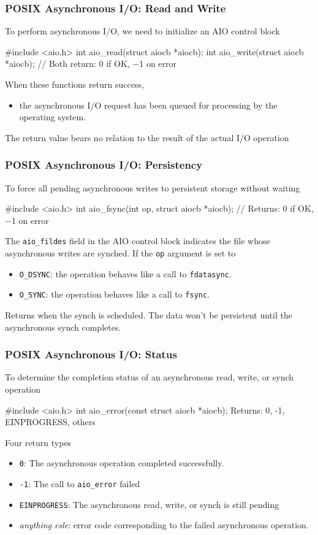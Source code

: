 \documentclass[newPxFont,sthlmFooter,nooffset]{beamer}
\begin{document}
\begin{frame}[t, fragile]
  \frametitle{POSIX Asynchronous I/O: Read and Write}
To perform asynchronous I/O, we need to initialize an AIO control block
\begin{codedef}
#include <aio.h>
int aio_read(struct aiocb *aiocb); int aio_write(struct aiocb *aiocb);
// Both return: 0 if OK, −1 on error
\end{codedef}
\bigskip
When these functions return success, 
\begin{itemize}
\item the asynchronous I/O request has been queued for processing by
  the operating system.
\end{itemize}
\bigskip

The return value bears no relation to the result of the actual I/O operation
\end{frame}


\begin{frame}[t, fragile]
  \frametitle{POSIX Asynchronous I/O: Persistency}
To force all pending asynchronous writes to persistent storage without waiting
\begin{codedef}
#include <aio.h>
int aio_fsync(int op, struct aiocb *aiocb);
// Returns: 0 if OK, −1 on error
\end{codedef}
The \texttt{aio\_fildes} field in the AIO control block indicates the file whose asynchronous writes are synched. 
\bigskip
If the \texttt{op} argument is set to
\begin{itemize}
\item \texttt{O\_DSYNC}: the operation behaves like a call to
  \texttt{fdatasync}.
\item \texttt{O\_SYNC}: the operation behaves like a call to \texttt{fsync}.
\end{itemize}

Returns when the synch is scheduled. The data won’t be persistent until the asynchronous synch completes. 
\end{frame}

\begin{frame}[t, fragile]
  \frametitle{POSIX Asynchronous I/O: Status}
To determine the completion status of an asynchronous read, write, or synch operation

\begin{codedef}
#include <aio.h>
int aio_error(const struct aiocb *aiocb);
Returns: 0, -1, EINPROGRESS, others
\end{codedef}

Four return types
\begin{itemize}
\item \texttt{0}: The asynchronous operation completed successfully.
\item \texttt{-1}: The call to \texttt{aio\_error} failed
\item \texttt{EINPROGRESS}: The asynchronous read, write, or synch is still pending
\item \textit{anything esle}: error code corresponding to the failed asynchronous operation.
\end{itemize}
\end{frame}
\end{document}
